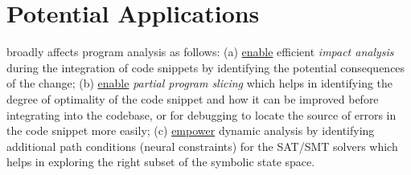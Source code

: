 \section{Potential Applications}
\tool broadly affects program analysis as follows: (a) \underline{enable} efficient \textit{impact analysis} during the integration of code snippets by identifying the potential consequences of the change; (b) \underline{enable} \textit{partial program slicing} which helps in identifying the degree of optimality of the code snippet and how it can be improved before integrating into the codebase, or for debugging to locate the source of errors in the code snippet more easily; (c) \underline{empower} dynamic analysis by identifying additional path conditions (neural constraints) for the SAT/SMT solvers which helps in exploring the right subset of the symbolic state space. 